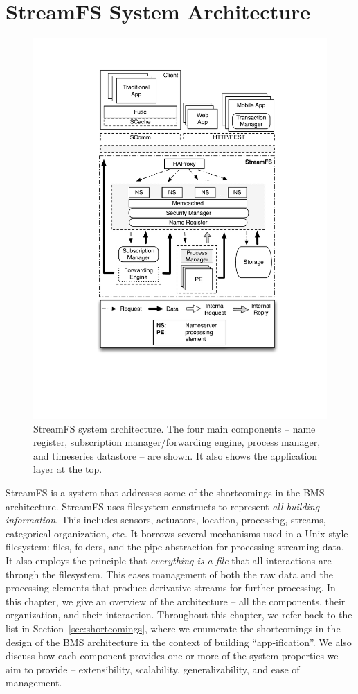 \chapter{StreamFS System Architecture}
\label{chap:SFSArchMain}



\begin{figure}[th!] %
\centering
\includegraphics[width=0.65\columnwidth]{figs/sfsarch}
\caption{StreamFS system architecture.  The four main components -- name register, subscription manager/forwarding engine, 
process manager, and timeseries datastore -- are shown.  It also shows the application layer at the top.}
\label{fig:sfsarch}
\end{figure}

StreamFS is a system that addresses some of the shortcomings in the BMS architecture.  StreamFS uses filesystem
constructs to represent \emph{all building information}.  This includes sensors, actuators, location, processing, 
streams, categorical organization, etc.  It borrows several mechanisms used in a Unix-style filesystem: files, folders,
and the pipe abstraction for processing streaming data.  It also employs the principle that \emph{everything is a file} 
that all interactions are through the filesystem.
This eases management of both the raw data and the processing elements that produce derivative streams for further processing.
In this chapter, we give an overview of the architecture -- all the components, their organization, and their interaction.
Throughout this chapter, we refer back to the list in Section~\ref{sec:shortcomings}, where we enumerate the shortcomings
in the design of the BMS architecture in the context of building ``app-ification''.  We also discuss how each component 
provides one or more of the system properties we aim to provide -- extensibility, scalability, generalizability, and
ease of management.


